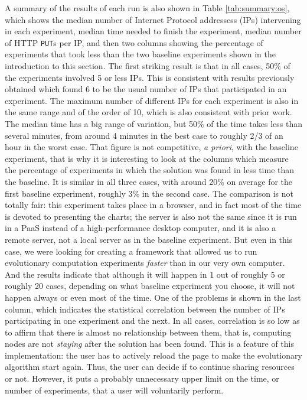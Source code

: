 \documentclass[journal,onecolumn]{IEEEtran}
\begin{document}
A summary of the results of each run is also shown in Table
\ref{tab:summary:os}, which shows the median number of Internet Protocol addressess (IPs)
intervening in each experiment,  median time needed
to finish the experiment, median number of HTTP {\tt PUT}s per IP, and
then two columns showing the percentage of experiments that took less
than the two baseline experiments shown in the introduction to this
section. The first striking result is that in all cases, 50\% of the
experiments involved 5 or less IPs. This is consistent with results
previously obtained \cite{DBLP:conf/gecco/GuervosG15} which found 6 to be
the usual number of IPs that participated in an experiment. The
maximum number of different IPs for each experiment is also in the
same range and of the order of 10, which is also consistent with
prior work. The median time has a big range of variation, but 50\% of
the time takes less than several minutes, from around 4 minutes in the
best case to roughly 2/3 of an hour in the worst case. That figure is
not competitive, {\em a priori}, with the baseline experiment, that is
why it is interesting to look at the columns which measure
the percentage of experiments in which the solution was found in less
time than the baseline. It is similar in all three cases, with around
20\% on average for the first baseline experiment, roughly 3\% in the
second case. The comparison is not totally fair: this experiment takes
place in a browser, and in fact most of the time is devoted to
presenting the charts; the server is also not the same since it is run in a
PaaS instead of a high-performance desktop computer, and it is also a
remote server, not a local server as in the baseline experiment. But
even in this case, we were looking for creating a framework that
allowed us to run evolutionary computation experiments {\em faster} than
in our very own computer. And the results indicate that although it will
happen in 1 out of roughly 5 or roughly 20 cases, depending on what baseline
experiment you choose, it will not happen always or even most of
the time. One of the problems is shown in the last column, which
indicates the statistical correlation between the number of IPs
participating in one experiment and the next. In all cases,
correlation is so low as to affirm that there is almost no
relationship between them, that is, computing nodes are not {\em
  staying} after the solution has been found. This is a feature of
this implementation: the user has to actively reload the page to make
the evolutionary algorithm start again. Thus, the user can decide if to continue sharing resources or not.%
 However, it puts a probably            %
unnecessary upper limit on the time, or number of experiments, that a user
will voluntarily perform.
\end{document}
